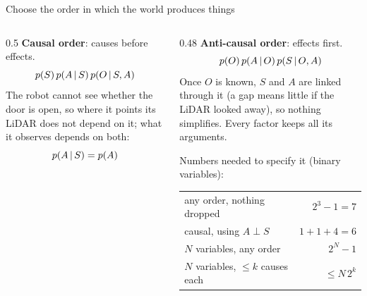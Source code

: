 \documentclass[10pt, aspectratio=169]{beamer}
\begin{document}
\begin{frame}{Choose the order in which the world produces things}
  \begin{columns}[T]
    \begin{column}{0.5\textwidth}
      \textbf{Causal order}: causes before effects.
      \[ p(S)\,p(A\,|\, S)\,p(O\,|\, S, A) \]
      The robot cannot see whether the door is open, so where it points its LiDAR does not
      depend on it; what it observes depends on both:
      \[ p(A\,|\, S) = p(A) \]
      \centering
    \end{column}
    \begin{column}{0.48\textwidth}
      \textbf{Anti-causal order}: effects first.
      \[ p(O)\,p(A\,|\, O)\,p(S\,|\, O, A) \]
      Once $O$ is known, $S$ and $A$ are linked through it (a gap means little if the LiDAR
      looked away), so nothing simplifies. Every factor keeps all its arguments.

      \vspace{0.6em}
      \footnotesize
      Numbers needed to specify it (binary variables):\\[0.3em]
      \begin{tabular}{@{}l r@{}}
        \toprule
        any order, nothing dropped         & $2^3 - 1 = 7$ \\
        causal, using $A \perp S$          & $1 + 1 + 4 = 6$ \\
        \midrule
        $N$ variables, any order           & $2^N - 1$ \\
        $N$ variables, $\le k$ causes each & $\le N\,2^k$ \\
        \bottomrule
      \end{tabular}
    \end{column}
  \end{columns}
\end{frame}
\end{document}
